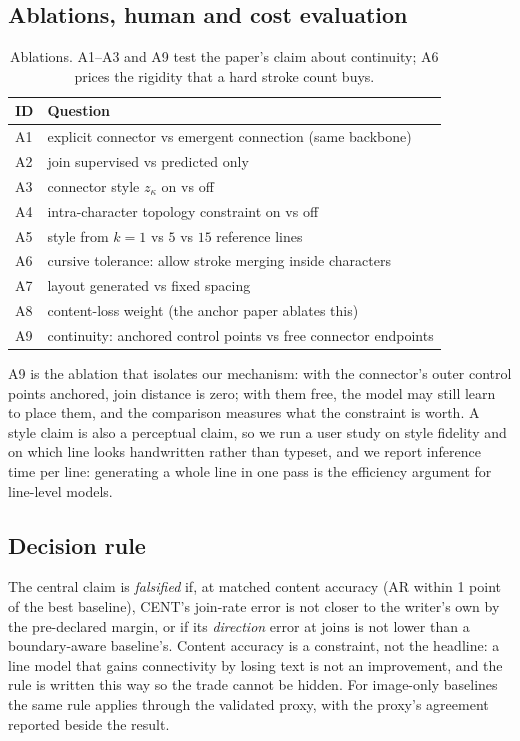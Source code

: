 \documentclass[conference]{IEEEtran}
\begin{document}
\subsection{Ablations, human and cost evaluation}
\begin{table}[t]
\centering
\caption{Ablations. A1--A3 and A9 test the paper's claim about continuity; A6 prices the
rigidity that a hard stroke count buys.}
\label{tab:ablations}
\small
\begin{tabular}{@{}l p{5.9cm}@{}}
\toprule
ID & Question \\
\midrule
A1 & explicit connector vs emergent connection (same backbone) \\
A2 & join supervised vs predicted only \\
A3 & connector style $z_\kappa$ on vs off \\
A4 & intra-character topology constraint on vs off \\
A5 & style from $k=1$ vs $5$ vs $15$ reference lines \\
A6 & cursive tolerance: allow stroke merging inside characters \\
A7 & layout generated vs fixed spacing \\
A8 & content-loss weight (the anchor paper ablates this) \\
A9 & continuity: anchored control points vs free connector endpoints \\
\bottomrule
\end{tabular}
\end{table}

A9 is the ablation that isolates our mechanism: with the connector's outer control points
anchored, join distance is zero; with them free, the model may still learn to place them, and
the comparison measures what the constraint is worth. A style claim is also a perceptual
claim, so we run a user study on style fidelity and on which line looks handwritten rather
than typeset, and we report inference time per line: generating a whole line in one pass is
the efficiency argument for line-level models.

\subsection{Decision rule}
The central claim is \emph{falsified} if, at matched content accuracy (AR within 1 point of
the best baseline), CENT's join-rate error is not closer to the writer's own by the
pre-declared margin, or if its \emph{direction} error at joins is not lower than a
boundary-aware baseline's. Content accuracy is a constraint, not the headline: a line model
that gains connectivity by losing text is not an improvement, and the rule is written this
way so the trade cannot be hidden. For image-only baselines the same rule applies through the
validated proxy, with the proxy's agreement reported beside the result.
\end{document}
